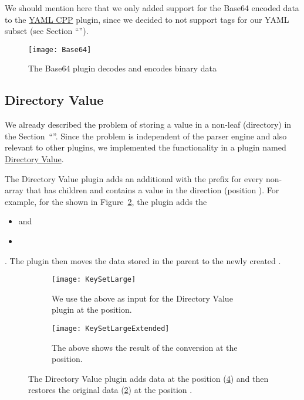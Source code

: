 We should mention here that we only added support for the Base64 encoded data to the \href{https://www.libelektra.org/plugins/yamlcpp}{YAML CPP} plugin, since we decided to not support tags for our YAML subset (see Section “”).

\begin{figure}
  \centering
    \texttt{[image: Base64]}
  \caption{The Base64 plugin decodes and encodes binary data}
  \label{fig:base64}
\end{figure}

\subsection{Directory Value}

We already described the problem of storing a value in a non-leaf (directory)  in the Section~“”. Since the problem is independent of the parser engine and also relevant to other plugins, we implemented the functionality in a plugin named \href{http://libelektra.org/plugins/directoryvalue}{Directory Value}.

The Directory Value plugin adds an additional  with the prefix  for every non-array  that has children and contains a value in the  direction (position ). For example, for the  shown in Figure~\ref{fig:keyset_large}, the plugin adds the 

\begin{itemize}
  \item {} and
  \item {}
\end{itemize}

. The plugin then moves the data stored in the parent  to the newly created .

\begin{figure}[H]
  \centering
  \begin{subfigure}[t]{.4\textwidth}
    \texttt{[image: KeySetLarge]}
    \caption{We use the  above as input for the Directory Value plugin at the  position.}
    \label{fig:keyset_large}
  \end{subfigure}
  \qquad
  \begin{subfigure}[t]{.48\textwidth}
    \texttt{[image: KeySetLargeExtended]}
    \caption{The  above shows the result of the conversion at the  position.}
    \label{fig:keyset_large_extended}
  \end{subfigure}
  \caption{The Directory Value plugin adds data at the position  (\ref{fig:keyset_large_extended}) and then restores the original data (\ref{fig:keyset_large}) at the position .}
\end{figure}

